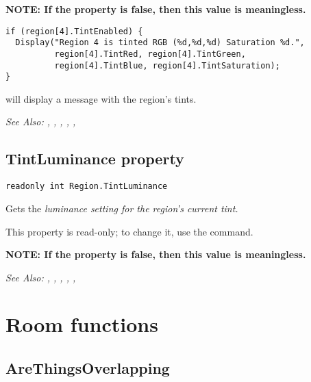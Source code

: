 \bf{NOTE:} If the  property is false, then
this value is meaningless.

\begin{verbatim}
if (region[4].TintEnabled) {
  Display("Region 4 is tinted RGB (%d,%d,%d) Saturation %d.",
          region[4].TintRed, region[4].TintGreen,
          region[4].TintBlue, region[4].TintSaturation);
}
\end{verbatim}
will display a message with the region's tints.

\it{See Also:} , ,
, ,
, 


\subsection{TintLuminance property}\label{Region.TintLuminance}%

\begin{verbatim}
readonly int Region.TintLuminance
\end{verbatim}
Gets the \it{luminance} setting for the region's current tint.

This property is read-only; to change it, use the  command.

\bf{NOTE:} If the  property is false, then
this value is meaningless.


\it{See Also:} , ,
, ,
, 



\section{Room functions}%


\subsection{AreThingsOverlapping}\label{AreThingsOverlapping}%

